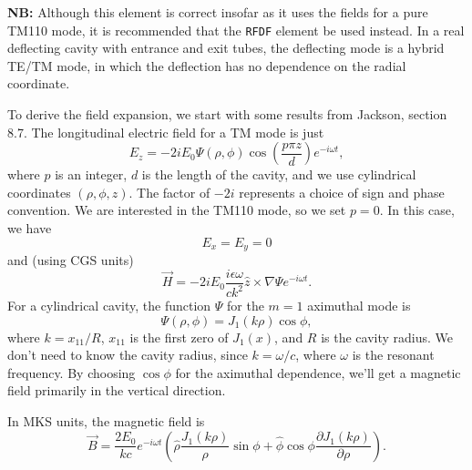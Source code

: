 {\bf NB:} Although this element is correct insofar as it uses the
fields for a pure TM110 mode, it is recommended that the {\tt RFDF}
element be used instead.  In a real deflecting cavity with entrance
and exit tubes, the deflecting mode is a hybrid TE/TM mode, in which
the deflection has no dependence on the radial coordinate.

To derive the field expansion, we start with some results from
Jackson\cite{Jackson}, section 8.7.  The longitudinal electric field
for a TM mode is just
\begin{equation}
E_z = - 2 i E_0 \Psi(\rho, \phi) \cos \left(\frac{p \pi z}{d}\right) e^{-i\omega t},
\end{equation}
where $p$ is an integer, $d$ is the length of the cavity, and we use
cylindrical coordinates $(\rho, \phi, z)$.  The factor of $-2i$ represents a
choice of sign and phase convention.  We are interested in the
TM110 mode, so we set $p=0$.  In this case, we have
\begin{equation}
E_x = E_y = 0 
\end{equation}
and (using CGS units)
\begin{equation}
\vec{H} = - 2 i E_0 \frac{i \epsilon \omega}{c k^2} \hat{z} \times \nabla \Psi e^{-i \omega t}.
\end{equation}
For a cylindrical cavity, the function $\Psi$ for the $m=1$ aximuthal mode is 
\begin{equation}
\Psi(\rho, \phi) = J_1 (k \rho) \cos \phi,
\end{equation}
where $k = x_{11}/R$, $x_{11}$ is the first zero of $J_1(x)$, and $R$ is the cavity radius.
We don't need to know the cavity radius, since $k = \omega/c$, where $\omega$ is the
resonant frequency.  By choosing $\cos\phi$ for the aximuthal dependence, we'll get 
a magnetic field primarily in the vertical direction.

In MKS units, the magnetic field is
\begin{equation}
\vec{B} = \frac{2 E_0}{k c} e^{-i \omega t} \left( \hat{\rho} \frac{J_1(k\rho)}{\rho} \sin \phi
        + \hat{\phi} \cos\phi \frac{\partial J_1(k\rho)}{\partial \rho}\right).
\end{equation}

